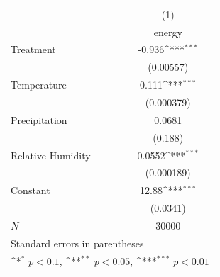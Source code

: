 {
\def\sym#1{\ifmmode^{#1}\else\(^{#1}\)\fi}
\begin{tabular}{l*{1}{c}}
\hline\hline
            &\multicolumn{1}{c}{(1)}\\
            &\multicolumn{1}{c}{energy}\\
\hline
Treatment   &      -0.936\sym{***}\\
            &   (0.00557)         \\
Temperature &       0.111\sym{***}\\
            &  (0.000379)         \\
Precipitation&      0.0681         \\
            &     (0.188)         \\
Relative Humidity&      0.0552\sym{***}\\
            &  (0.000189)         \\
Constant    &       12.88\sym{***}\\
            &    (0.0341)         \\
\hline
\(N\)       &       30000         \\
\hline\hline
\multicolumn{2}{l}{\footnotesize Standard errors in parentheses}\\
\multicolumn{2}{l}{\footnotesize \sym{*} \(p<0.1\), \sym{**} \(p<0.05\), \sym{***} \(p<0.01\)}\\
\end{tabular}
}
